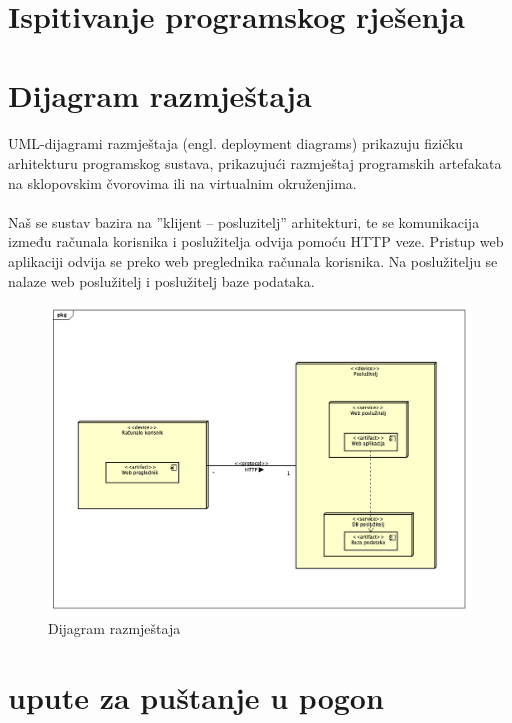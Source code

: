 \section{Ispitivanje programskog rješenja}

\section{Dijagram razmještaja}

\paragraph{}{
UML-dijagrami razmještaja (engl. deployment diagrams) prikazuju fizičku arhitekturu programskog sustava, prikazujući razmještaj programskih artefakata na sklopovskim čvorovima ili na virtualnim okruženjima.
}

\paragraph{}{
Naš se sustav bazira na ”klijent – posluzitelj” arhitekturi, te se komunikacija između računala korisnika i poslužitelja odvija pomoću HTTP veze. Pristup web aplikaciji odvija se preko web preglednika računala korisnika. Na poslužitelju se nalaze web poslužitelj i poslužitelj baze podataka.
}

\begin{figure}[!htb]
	\centering
	\includegraphics[width=1\linewidth]{dijagrami/DijagramRazmjestaja.png}
	\caption{Dijagram razmještaja}
	\label{fig:modelsdiagram}
\end{figure}

\section{upute za puštanje u pogon}


\eject